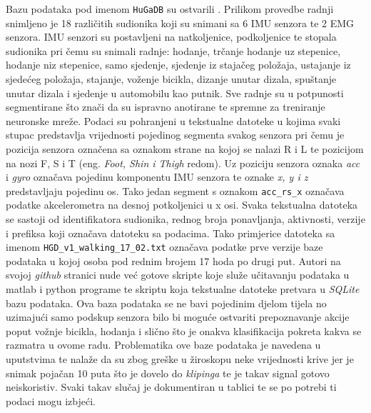 \documentclass[times, utf8, diplomski]{fer}
\begin{document}
Bazu podataka pod imenom \texttt{HuGaDB} su ostvarili \cite{HuGaDB}. Prilikom provedbe radnji snimljeno je 18 različitih sudionika
koji su snimani sa 6 IMU senzora te 2 EMG senzora. IMU senzori su postavljeni na natkoljenice, podkoljenice te stopala sudionika
pri čemu su snimali radnje: hodanje, trčanje hodanje uz stepenice, hodanje niz stepenice, samo sjedenje, sjedenje iz stajačeg položaja,
ustajanje iz sjedećeg položaja, stajanje, voženje bicikla, dizanje unutar dizala, spuštanje unutar dizala i sjedenje
u automobilu kao putnik. Sve radnje su u potpunosti segmentirane što znači da su ispravno anotirane te spremne za treniranje
neuronske mreže. Podaci su pohranjeni u tekstualne datoteke u kojima svaki stupac predstavlja vrijednosti pojedinog segmenta
svakog senzora pri čemu je pozicija senzora označena sa oznakom strane na kojoj se nalazi R i L te pozicijom na nozi F, S i T
(eng. \textit{Foot, Shin i Thigh} redom). Uz poziciju senzora oznaka \textit{acc} i \textit{gyro} označava pojedinu komponentu
IMU senzora te oznake \textit{x, y i z} predstavljaju pojedinu os. Tako jedan segment s oznakom \texttt{acc\_rs\_x} označava
podatke akcelerometra na desnoj potkoljenici u x osi. Svaka tekstualna datoteka se sastoji od identifikatora sudionika,
rednog broja ponavljanja, aktivnosti, verzije i prefiksa koji označava datoteku sa podacima. Tako primjerice datoteka sa imenom
\texttt{HGD\_v1\_walking\_17\_02.txt} označava podatke prve verzije baze podataka u kojoj osoba pod rednim brojem 17 hoda po
drugi put. Autori \cite{HuGaDB} na svojoj \textit{github} stranici nude već gotove skripte koje služe učitavanju podataka u
matlab i python programe te skriptu koja tekstualne datoteke pretvara u \textit{SQLite} bazu podataka.
Ova baza podataka se ne bavi pojedinim djelom tijela no uzimajući samo podskup 
senzora bilo bi moguće ostvariti prepoznavanje akcije poput vožnje bicikla, hodanja i slično što je onakva klasifikacija pokreta
kakva se razmatra u ovome radu. Problematika ove baze podataka je navedena u uputstvima te nalaže da su zbog greške u žiroskopu
neke vrijednosti krive jer je snimak pojačan 10 puta što je dovelo do \textit{klipinga} te je takav signal gotovo neiskoristiv.
Svaki takav slučaj je dokumentiran u tablici te se po potrebi ti podaci mogu izbjeći.
\end{document}
